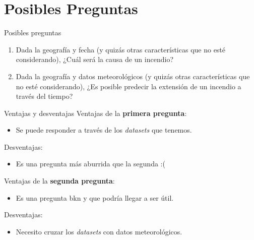 \section{Posibles Preguntas}
\begin{frame}{Posibles preguntas}
    \begin{enumerate}
        \item Dada la geografía y fecha (y quizás otras características que no esté considerando), ¿Cuál será la causa de un incendio? 
        \item Dada la geografía y datos meteorológicos (y quizás otras características que no esté considerando), ¿Es posible predecir la extensión de un incendio a través del tiempo?
    \end{enumerate}
\end{frame}

\begin{frame}{Ventajas y desventajas}
    Ventajas de la \textbf{primera pregunta}:
    \begin{itemize}
        \item[\ding{51}] Se puede responder a través de los \textit{datasets} que tenemos.
    \end{itemize}
    Desventajas:
    \begin{itemize}
        \item[\ding{55}] Es una pregunta más aburrida que la segunda :(
    \end{itemize}
    
    Ventajas de la \textbf{segunda pregunta}:
    \begin{itemize}
        \item[\ding{51}] Es una pregunta bkn y que podría llegar a ser útil.
    \end{itemize}
    Desventajas:
    \begin{itemize}
        \item[\ding{55}] Necesito cruzar los \textit{datasets} con datos meteorológicos.
    \end{itemize}
\end{frame}

